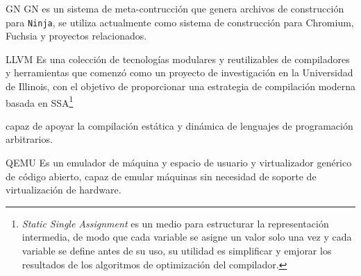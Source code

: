 \begin{frame}{GN}
	GN es un sistema de meta-contrucción que genera archivos de construcción para \texttt{Ninja},  se utiliza actualmente como sistema de construcción para Chromium, Fuchsia y proyectos relacionados.
\end{frame}

\begin{frame}{LLVM}
	Es una colección de tecnologías modulares y reutilizables de compiladores y herramientas que comenzó como un proyecto de investigación en la Universidad de Illinois, con el objetivo de proporcionar una estrategia de compilación moderna basada en 
	SSA\footnote{
		\textit{Static Single Assignment}  es un medio para estructurar la representación intermedia, de modo que cada variable se asigne un valor solo una vez y cada variable se define antes de su uso, su utilidad es simplificar y emjorar los resultados de los algoritmos de optimización del compilador.
	}
	
	capaz de apoyar la compilación estática y dinámica de lenguajes de programación arbitrarios.
\end{frame}

\begin{frame}{QEMU}
	Es un emulador de máquina y espacio de usuario y virtualizador genérico de código abierto, capaz de emular máquinas sin necesidad de soporte de virtualización de hardware.
\end{frame}








